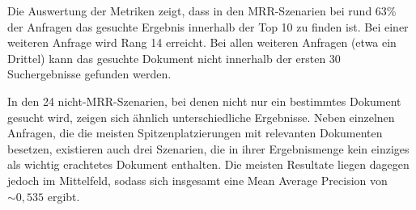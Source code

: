 Die Auswertung der Metriken zeigt, dass in den MRR-Szenarien bei rund 63\% der Anfragen das gesuchte Ergebnis innerhalb der Top 10 zu finden ist. Bei einer weiteren Anfrage wird Rang 14 erreicht. Bei allen weiteren Anfragen (etwa ein Drittel) kann das gesuchte Dokument nicht innerhalb der ersten 30 Suchergebnisse gefunden werden.
 
In den 24 nicht-MRR-Szenarien, bei denen nicht nur ein bestimmtes Dokument gesucht wird, zeigen sich ähnlich unterschiedliche Ergebnisse. Neben einzelnen Anfragen, die die meisten Spitzenplatzierungen mit relevanten Dokumenten besetzen, existieren auch drei Szenarien, die in ihrer Ergebnismenge kein einziges als wichtig erachtetes Dokument enthalten. Die meisten Resultate liegen dagegen jedoch im Mittelfeld, sodass sich insgesamt eine Mean Average Precision von $ \sim{}0,535 $ ergibt.
